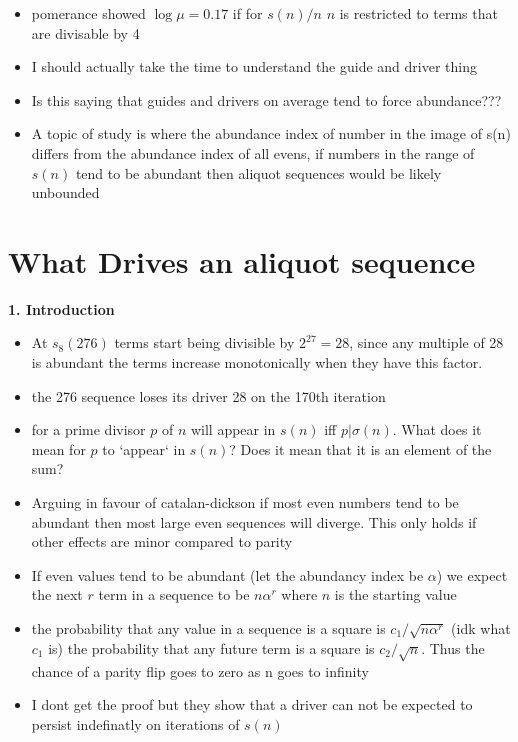 \begin{itemize}
    \item pomerance showed $\log \mu = 0.17$ if for $s(n)/n$ $n$ is restricted to terms that are divisable by 4
    \item I should actually take the time to understand the guide and driver thing
    \item Is this saying that guides and drivers on average tend to force abundance???
    \item A topic of study is where the abundance index of number in the image of s(n) differs from the abundance index of all evens, if numbers in the range of $s(n)$ tend to be abundant then aliquot sequences would be likely unbounded
\end{itemize}

\section{What Drives an aliquot sequence} %


\textbf{1. Introduction}
\begin{itemize}
\item At $s_8(276)$ terms start being divisible by $2^27 = 28$, since any multiple of 28 is abundant the terms increase monotonically when they have this factor.
\item the 276 sequence loses its driver 28 on the 170th iteration
\item for a prime divisor $p$ of $n$ will appear in $s(n)$ iff $p | \sigma(n)$. What does it mean for $p$ to `appear` in $s(n)$? Does it mean that it is an element of the sum?
\item Arguing in favour of catalan-dickson if most even numbers tend to be abundant then most large even sequences will diverge. This only holds if other effects are minor compared to parity
\item If even values tend to be abundant (let the abundancy index be $\alpha$) we expect the next $r$ term in a sequence to be $n\alpha^r$ where $n$ is the starting value 
\item the probability that any value in a sequence is a square is $c_1 / \sqrt{n\alpha^r}$ (idk what $c_1$ is) the probability that any future term is a square is $c_2 / \sqrt{n}$. Thus the chance of a parity flip goes to zero as n goes to infinity
\item I dont get the proof but they show that a driver can not be expected to persist indefinatly on iterations of $s(n)$
\end{itemize}